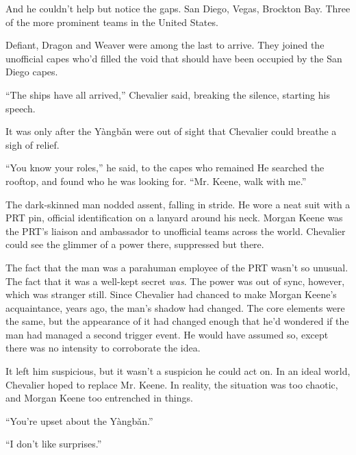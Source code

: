 And he couldn't help but notice the gaps.  San Diego, Vegas, Brockton Bay.  Three of the more prominent teams in the United States.



Defiant, Dragon and Weaver were among the last to arrive.  They joined the unofficial capes who'd filled the void that should have been occupied by the San Diego capes.



``The ships have all arrived,'' Chevalier said, breaking the silence, starting his speech.



\blacksquare



It was only after the Y\`{a}ngb\v{a}n were out of sight that Chevalier could breathe a sigh of relief.



``You know your roles,'' he said, to the capes who remained  He searched the rooftop, and found who he was looking for.  ``Mr. Keene, walk with me.''



The dark-skinned man nodded assent, falling in stride.  He wore a neat suit with a PRT pin, official identification on a lanyard around his neck.  Morgan Keene was the PRT's liaison and ambassador to unofficial teams across the world.  Chevalier could see the glimmer of a power there, suppressed but there.



The fact that the man was a parahuman employee of the PRT wasn't so unusual.  The fact that it was a well-kept secret \emph{was}.  The power was out of sync, however, which was stranger still.  Since Chevalier had chanced to make Morgan Keene's acquaintance, years ago, the man's shadow had changed.  The core elements were the same, but the appearance of it had changed enough that he'd wondered if the man had managed a second trigger event.  He would have assumed so, except there was no intensity to corroborate the idea.



It left him suspicious, but it wasn't a suspicion he could act on.  In an ideal world, Chevalier hoped to replace Mr. Keene.  In reality, the situation was too chaotic, and Morgan Keene too entrenched in things.



``You're upset about the Y\`{a}ngb\v{a}n.''



``I don't like surprises.''



